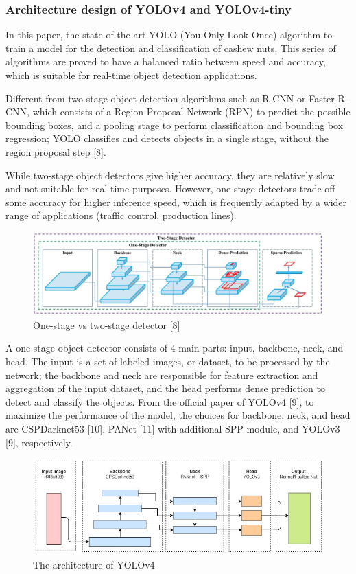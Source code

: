 \documentclass[10pt, letterpaper]{article}
\begin{document}
\subsubsection*{Architecture design of YOLOv4 and YOLOv4-tiny}
    In this paper, the state-of-the-art YOLO (You Only Look Once) algorithm to train a model for the detection and classification of cashew nuts. This series of algorithms are proved to have a balanced ratio between speed and accuracy, which is suitable for real-time object detection applications.\par
    Different from two-stage object detection algorithms such as R-CNN or Faster R-CNN, which consists of a Region Proposal Network (RPN) to predict the possible bounding boxes, and a pooling stage to perform classification and bounding box regression; YOLO classifies and detects objects in a single stage, without the region proposal step [8].\par
    While two-stage object detectors give higher accuracy, they are relatively slow and not suitable for real-time purposes. However, one-stage detectors trade off some accuracy for higher inference speed, which is frequently adapted by a wider range of applications (traffic control, production lines).\par
    \begin{figure}[h]
        \centering
        \includegraphics[width=\textwidth]{fig4.JPG}
        \caption{One-stage vs two-stage detector [8]}
    \end{figure}
    A one-stage object detector consists of 4 main parts: input, backbone, neck, and head. The input is a set of labeled images, or dataset, to be processed by the network; the backbone and neck are responsible for feature extraction and aggregation of the input dataset, and the head performs dense prediction to detect and classify the objects. From the official paper of YOLOv4 [9], to maximize the performance of the model, the choices for backbone, neck, and head are CSPDarknet53 [10], PANet [11] with additional SPP module, and YOLOv3 [9], respectively.\par
    \begin{figure}[h]
        \centering
        \includegraphics[width=\textwidth]{fig5.JPG}
        \caption{The architecture of YOLOv4}
    \end{figure}
\end{document}

